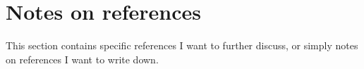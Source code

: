 \section{Notes on references}

This section contains specific references I want to further discuss, or simply notes on references I want to write down.